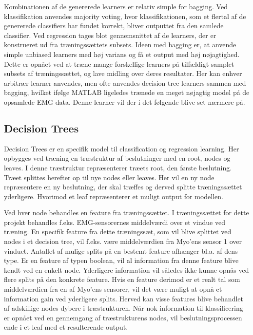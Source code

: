Kombinationen af de genererede learners er relativ simple for bagging. Ved klassifikation anvendes majority voting, hvor klassifikationen, som et flertal af de genererede classifiers har fundet korrekt, bliver outputtet fra den samlede classifier.
Ved regression tages blot gennemsnittet af de learners, der er konstrueret ud fra træningssættets subsets. Ideen med bagging er, at anvende simple unbiased learners med høj varians og få et output med høj nøjagtighed. Dette er opnået ved at træne mange forskellige learners på tilfældigt samplet subsets af træningssættet, og lave midling over deres resultater. Her kan enhver arbitrær learner anvendes, men ofte anvendes decision tree learners sammen med bagging, hvilket ifølge MATLAB ligeledes trænede en meget nøjagtig model på de opsamlede EMG-data. Denne learner vil der i det følgende blive set nærmere på.

\subsection{Decision Trees}
Decision Trees er en specifik model til classification og regression learning. Her opbygges ved træning en træstruktur af beslutninger med en root, nodes og leaves. I denne træstruktur repræsenterer træets root, den første beslutning. Træet splittes herefter op til nye nodes eller leaves. Her vil en ny node repræsentere en ny beslutning, der skal træffes og derved splitte træningssættet yderligere. Hvorimod et leaf repræsenterer et muligt output for modellen. 


Ved hver node behandles en feature fra træningssættet. I træningssættet for dette projekt behandles f.eks. EMG-sensorernes middelværdi over et vindue ved træning. En specifik feature fra dette træningssæt, som vil blive splittet ved nodes i et decision tree, vil f.eks. være middelværdien fra Myo’ens sensor 1 over vinduet. 
Antallet af mulige splits på en bestemt feature afhænger bl.a. af dens type. Er en feature af typen boolean, vil al information fra denne feature blive kendt ved en enkelt node. Yderligere information vil således ikke kunne opnås ved flere splits på den konkrete feature. Hvis en feature derimod er et realt tal som middelværdien fra en af Myo’ens sensorer, vil det være muligt at opnå et information gain ved yderligere splits. Herved kan visse features blive behandlet af adskillige nodes dybere i træstrukturen.
Når nok information til klassificering er opnået ved en gennemgang af træstrukturens nodes, vil beslutningsprocessen ende i et leaf med et resulterende output. 

